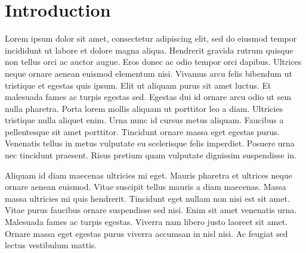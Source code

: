 


\chapter{Introduction}

Lorem ipsum dolor sit amet, consectetur adipiscing elit, sed do eiusmod tempor incididunt ut labore et dolore magna aliqua. Hendrerit gravida rutrum quisque non tellus orci ac auctor augue. Eros donec ac odio tempor orci dapibus. Ultrices neque ornare aenean euismod elementum nisi. Vivamus arcu felis bibendum ut tristique et egestas quis ipsum. Elit ut aliquam purus sit amet luctus. Et malesuada fames ac turpis egestas sed. Egestas dui id ornare arcu odio ut sem nulla pharetra. Porta lorem mollis aliquam ut porttitor leo a diam. Ultricies tristique nulla aliquet enim. Urna nunc id cursus metus aliquam. Faucibus a pellentesque sit amet porttitor. Tincidunt ornare massa eget egestas purus. Venenatis tellus in metus vulputate eu scelerisque felis imperdiet. Posuere urna nec tincidunt praesent. Risus pretium quam vulputate dignissim suspendisse in.

Aliquam id diam maecenas ultricies mi eget. Mauris pharetra et ultrices neque ornare aenean euismod. Vitae suscipit tellus mauris a diam maecenas. Massa massa ultricies mi quis hendrerit. Tincidunt eget nullam non nisi est sit amet. Vitae purus faucibus ornare suspendisse sed nisi. Enim sit amet venenatis urna. Malesuada fames ac turpis egestas. Viverra nam libero justo laoreet sit amet. Ornare massa eget egestas purus viverra accumsan in nisl nisi. Ac feugiat sed lectus vestibulum mattis.

\autocite{Schlund2020}
\autocite{Schlund2020a}